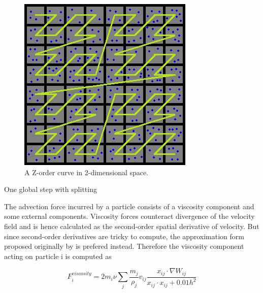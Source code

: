 \documentclass[
	11pt, 
	DIV10,
	ngerman,
	a4paper, 
	oneside, 
	headings=normal, 
	captions=tableheading,
	final, 
	numbers=noenddot
]{scrartcl}
\begin{document}
\begin{figure}[tb]
	\centering
	\includegraphics[scale=0.5]{images/z}
	\caption{\label{fig6} A Z-order curve in 2-dimensional space.}
\end{figure}

\large
\begin{algorithm}
	\DontPrintSemicolon
	\SetAlgoLined
	\SetAlCapNameFnt{\large}
	\SetAlCapFnt{\large}
	\caption{\label{alg1} One global step with splitting \cite{reinhardt2017fully}}
\end{algorithm}
\normalsize

The advection force incurred by a particle consists of a viscosity component and some external components. Viscosity forces counteract divergence of the velocity field and is hence calculated as the second-order spatial derivative of velocity. But since second-order derivatives are tricky to compute, the approximation form proposed originally by \cite{monaghan1992smoothed} is prefered instead. Therefore the viscosity component acting on particle i is computed as

\begin{equation}
	\label{eq2}
	F_{i}^{viscosity} = 2m_{i}\nu \sum_{j}\frac{m_{j}}{\rho_{j}}v_{ij}\frac{x_{ij} \cdot \nabla W_{ij}}{x_{ij}\cdot x_{ij} + 0.01h^{2}}
\end{equation}
\end{document}
